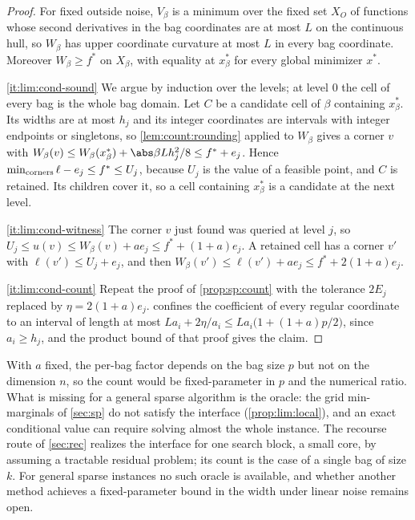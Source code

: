 \begin{proof}
For fixed outside noise, $V_\beta$ is a minimum over the fixed set $X_O$ of
functions whose second derivatives in the bag coordinates are at most $L$ on
the continuous hull, so $W_\beta$ has upper coordinate curvature at most $L$
in every bag coordinate. Moreover $W_\beta\ge f^*$ on $X_\beta$, with
equality at $x^*_\beta$ for every global minimizer $x^*$.

\ref{it:lim:cond-sound} We argue by induction over the levels; at level $0$
the cell of every bag is the whole bag domain. Let $C$ be a candidate cell of
$\beta$ containing $x^*_\beta$. Its widths are at most $h_j$ and its integer
coordinates are intervals with integer endpoints or singletons, so
\cref{lem:count:rounding} applied to $W_\beta$ gives a corner $v$ with
$W_\beta(v)\le W_\beta(x^*_\beta)+\abs\beta Lh_j^2/8\le f^*+e_j$. Hence
$\min_{\rm corners}\ell-e_j\le f^*\le U_j$, because $U_j$ is the value of a
feasible point, and $C$ is retained. Its children cover it, so a cell
containing $x^*_\beta$ is a candidate at the next level.

\ref{it:lim:cond-witness} The corner $v$ just found was queried at level
$j$, so $U_j\le u(v)\le W_\beta(v)+ae_j\le f^*+(1+a)e_j$. A retained cell has
a corner $v'$ with $\ell(v')\le U_j+e_j$, and then
$W_\beta(v')\le\ell(v')+ae_j\le f^*+2(1+a)e_j$.

\ref{it:lim:cond-count} Repeat the proof of \cref{prop:sp:count} with the
tolerance $2E_j$ replaced by $\eta=2(1+a)e_j$.  confines
the coefficient of every regular coordinate to an interval of length at
most $La_i+2\eta/a_i\le La_i\bigl(1+(1+a)p/2\bigr)$, since $a_i\ge h_j$, and
the product bound of that proof gives the claim.
\end{proof}

With $a$ fixed, the per-bag factor depends on the bag size $p$ but not on
the dimension $n$, so the count would be fixed-parameter in $p$ and the
numerical ratio. What is missing for a general sparse algorithm is the
oracle: the grid min-marginals of \cref{sec:sp} do not satisfy the interface
(\cref{prop:lim:local}), and an exact conditional value can require solving
almost the whole instance. The recourse route of \cref{sec:rec} realizes the
interface for one search block, a small core, by assuming a tractable
residual problem; its count is the case of a single bag of size $k$. For
general sparse instances no such oracle is available, and whether another
method achieves a fixed-parameter bound in the width under linear noise
remains open.

